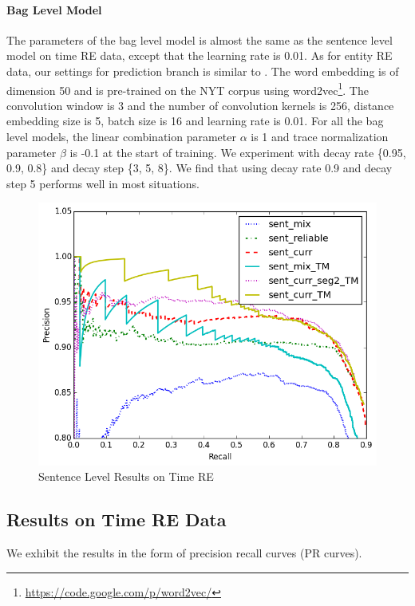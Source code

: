 \paragraph{Bag Level Model}
The parameters of the bag level model is almost the same as the sentence level model on time RE data, except that the learning rate is 0.01. As for entity RE data, our settings for prediction branch is similar to \cite{lin2016neural}. The word embedding is of dimension 50 and is pre-trained on the NYT corpus using word2vec\footnote{\url{ https://code.google.com/p/word2vec/}}. The convolution window is 3 and the number of convolution kernels is 256, distance embedding size is 5, batch size is 16 and learning rate is 0.01. For all the bag level models, the linear combination parameter $\alpha$ is 1 and trace normalization parameter $\beta$ is -0.1 at the start of training. We experiment with decay rate \{0.95, 0.9, 0.8\} and decay step \{3, 5, 8\}. We find that using decay rate 0.9 and decay step 5 performs well in most situations.

\begin{figure}[htbp]
\begin{center}
\includegraphics[width=0.9\linewidth]{figures/sent_time_exp_overall.png}
\caption{Sentence Level Results on Time RE}
\label{fig: sent_luo}
\end{center}
\end{figure}

\subsection{Results on Time RE Data}
We exhibit the results in the form of precision recall curves (PR curves).

